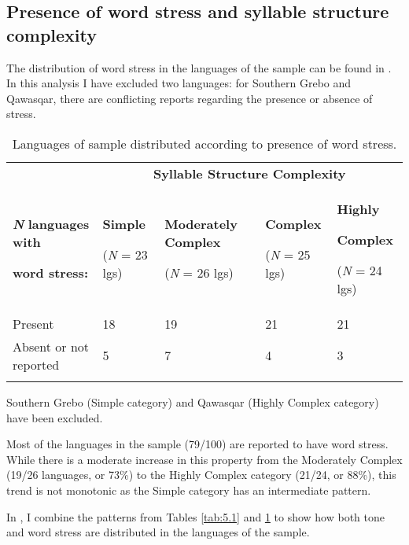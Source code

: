 \subsection{Presence of word stress and syllable structure complexity}\label{sec:5.4.1}

  The distribution of word stress in the languages of the sample can be found in . In this analysis I have excluded two languages: for Southern Grebo and Qawasqar, there are conflicting reports regarding the presence or absence of stress.

\begin{table}
\begin{tabularx}{\textwidth}{XXXXX}
\lsptoprule
 & \multicolumn{4}{c}{ \textbf{Syllable Structure Complexity}}\\
{ \textbf{\textit{N}} \textbf{languages with} }

 \textbf{word stress:} & { \textbf{Simple}}

 (\textit{N} = 23 lgs) & { \textbf{Moderately Complex}}

 (\textit{N} = 26 lgs) & { \textbf{Complex}}

 (\textit{N} = 25 lgs) & { \textbf{Highly} }

{ \textbf{Complex}}

 (\textit{N} = 24 lgs)\\
 Present & 18 & 19 & 21 & 21\\
 Absent or not reported & 5 & 7 & 4 & 3\\
\lspbottomrule
\end{tabularx}
\caption{\label{tab:5.2}Languages of sample distributed according to presence of word stress.}Southern Grebo (Simple category) and Qawasqar (Highly Complex category) have been excluded.
\end{table}

  Most of the languages in the sample (79/100) are reported to have word stress. While there is a moderate increase in this property from the Moderately Complex (19/26 languages, or 73\%) to the Highly Complex category (21/24, or 88\%), this trend is not monotonic as the Simple category has an intermediate pattern.

  In , I combine the patterns from Tables \ref{tab:5.1} and \ref{tab:5.2} to show how both tone and word stress are distributed in the languages of the sample.

